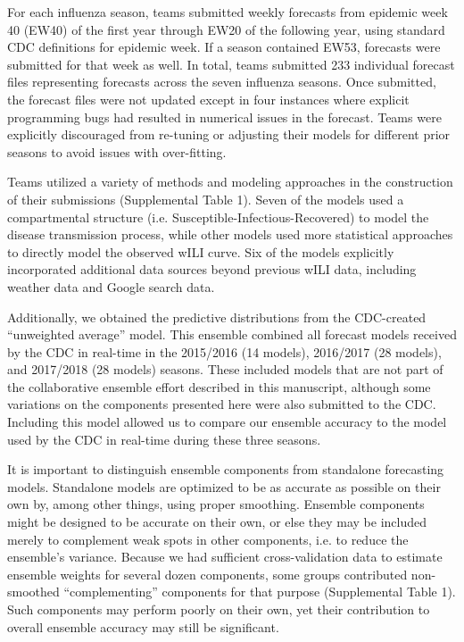 \documentclass{article}\usepackage[]{graphicx}\usepackage[]{color}
\begin{document}
For each influenza season, teams submitted weekly forecasts from epidemic week 40 (EW40) of the first year through EW20 of the following year, using standard CDC definitions for epidemic week.\cite{NewMexicoDepartmentofHealth,Niemi2015,Tushar2018} If a season contained EW53, forecasts were submitted for that week as well. In total, teams submitted 233 individual forecast files representing forecasts across the seven influenza seasons. Once submitted, the forecast files were not updated except in four instances where explicit programming bugs had resulted in numerical issues in the forecast. Teams were explicitly discouraged from re-tuning or adjusting their models for different prior seasons to avoid issues with over-fitting.

Teams utilized a variety of methods and modeling approaches in the construction of their submissions (Supplemental Table 1). Seven of the models used a compartmental structure (i.e. Susceptible-Infectious-Recovered) to model the disease transmission process, while other models used more statistical approaches to directly model the observed wILI curve. Six of the models explicitly incorporated additional data sources beyond previous wILI data, including weather data and Google search data.  

Additionally, we obtained the predictive distributions from the CDC-created ``unweighted average'' model. This ensemble combined all forecast models received by the CDC in real-time in the 2015/2016 (14 models), 2016/2017 (28 models), and 2017/2018 (28 models) seasons.\cite{McGowan2018} These included models that are not part of the collaborative ensemble effort described in this manuscript, although some variations on the components presented here were also submitted to the CDC. Including this model allowed us to compare our ensemble accuracy to the model used by the CDC in real-time during these three seasons.

It is important to distinguish ensemble components from standalone forecasting models.  
Standalone models are optimized to be as accurate as possible on their own by, among other things, using proper smoothing.
Ensemble components might be designed to be accurate on their own, or else they may be included merely to complement weak spots in other components, i.e. to reduce the ensemble's variance.  
Because we had sufficient cross-validation data to estimate ensemble weights for several dozen components, some groups contributed non-smoothed ``complementing'' components for that purpose (Supplemental Table 1).  
Such components may perform poorly on their own, yet their contribution to overall ensemble accuracy may still be significant.
\end{document}
